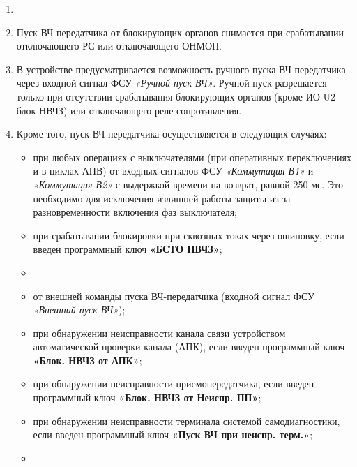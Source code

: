 \begin{enumerate}
\begin{enumerate}
\medskip

\item
{}

\item
Пуск ВЧ-передатчика от блокирующих органов снимается при срабатывании отключающего РС или отключающего ОНМОП.

\item
В устройстве предусматривается возможность ручного пуска ВЧ-передатчика через входной сигнал ФСУ \textit{«Ручной пуск ВЧ»}.
Ручной пуск разрешается только при отсутствии срабатывания блокирующих органов (кроме ИО U2 блок НВЧЗ) или отключающего реле сопротивления.

\item
Кроме того, пуск ВЧ-передатчика осуществляется в следующих случаях:
\begin{itemize} 
\item при любых операциях с выключателями (при оперативных переключениях и в циклах АПВ) от входных сигналов ФСУ \textit{«Коммутация В1»} и \textit{«Коммутация В2»} с выдержкой времени на возврат, равной 250 мс.
Это необходимо для исключения излишней работы защиты из-за разновременности включения фаз выключателя;
\item при срабатывании блокировки при сквозных токах через ошиновку, если введен программный ключ \textbf{«БСТО НВЧЗ»};
\item {}
\item от внешней команды пуска ВЧ-передатчика (входной сигнал ФСУ \textit{«Внешний пуск ВЧ»});
\item при обнаружении неисправности канала связи устройством автоматической проверки канала (АПК), если введен программный ключ \textbf{«Блок. НВЧЗ от АПК»};
\item при обнаружении неисправности приемопередатчика, если введен программный ключ \textbf{«Блок. НВЧЗ от Неиспр. ПП»};
\item при обнаружении неисправности терминала системой самодиагностики, если введен программный ключ \textbf{«Пуск ВЧ при неиспр. терм.»};
\item {}
\end{itemize}


\end{enumerate}
\end{enumerate}
